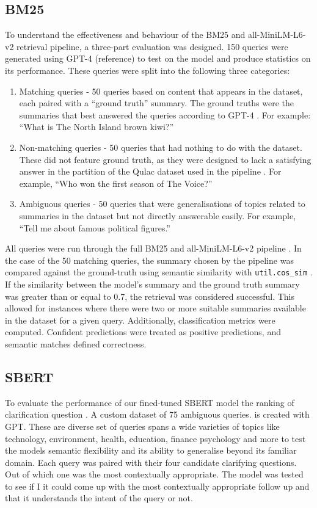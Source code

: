 \documentclass[11pt]{article}
\begin{document}
\subsection{BM25}
To understand the effectiveness and behaviour of the BM25 and all-MiniLM-L6-v2 retrieval pipeline, a three-part evaluation was designed. 150 queries were generated using GPT-4 (reference) to test on the model and produce statistics on its performance. These queries were split into the following three categories:
\begin{enumerate}
\item Matching queries - 50 queries based on content that appears in the dataset, each paired with a “ground truth” summary. The ground truths were the summaries that best answered the queries according to GPT-4 \cite{OpenAI2025}. For example: “What is The North Island brown kiwi?”
\item Non-matching queries - 50 queries that had nothing to do with the dataset. These did not feature ground truth, as they were designed to lack a satisfying answer in the partition of the Qulac dataset used in the pipeline \cite{Aliannejadi2021}. For example, “Who won the first season of The Voice?”
\item Ambiguous queries - 50 queries that were generalisations of topics related to summaries in the dataset but not directly answerable easily. For example, “Tell me about famous political figures.”
\end{enumerate}

All queries were run through the full BM25 and all-MiniLM-L6-v2 pipeline \cite{Brown2022,Tomaarsen2025a}. In the case of the 50 matching queries, the summary chosen by the pipeline was compared against the ground-truth using semantic similarity with \texttt{util.cos\_sim} \cite{Tomaarsen2025b}. If the similarity between the model's summary and the ground truth summary was greater than or equal to 0.7, the retrieval was considered successful. This allowed for instances where there were two or more suitable summaries available in the dataset for a given query. Additionally, classification metrics were computed. Confident predictions were treated as positive predictions, and semantic matches defined correctness.

\subsection{SBERT}
To evaluate the performance of our fined-tuned SBERT model the ranking of clarification question \cite{Tomaarsen2025b}. A custom dataset of 75 ambiguous queries.  is created with GPT. These are diverse set of queries spans a wide varieties of topics like technology, environment, health, education, finance psychology and more to test the models semantic flexibility and its ability to generalise beyond its familiar domain. Each query was paired with their four candidate clarifying questions. Out of which one was the most contextually appropriate.  The model was tested to see if I it could come up with the most contextually appropriate follow up and that it understands the intent of the query or not. 
\end{document}
